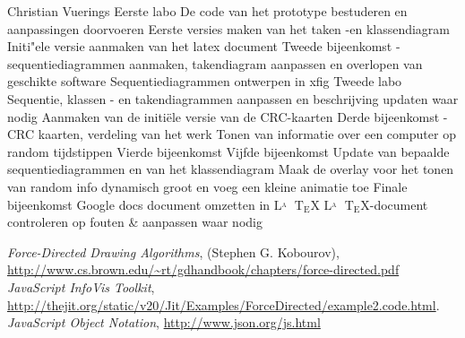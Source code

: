 \documentclass[a4paper,oneside]{report}
\def\latex{$\mathrm{L\!\!^{{}_{\scriptstyle A}} \!\!\!\!\!\;\; T\!_{\displaystyle E} \!
X}$}
\begin{document}
\begin{studentlog}{Christian Vuerings}
{Eerste labo}
{De code van het prototype bestuderen en aanpassingen doorvoeren}
{Eerste versies maken van het taken -en klassendiagram}
{Initi"ele versie aanmaken van het latex document}
{Tweede bijeenkomst - sequentiediagrammen aanmaken, takendiagram aanpassen en overlopen van geschikte software}
{Sequentiediagrammen ontwerpen in xfig}
{Tweede labo}
{Sequentie, klassen - en takendiagrammen aanpassen en beschrijving updaten waar nodig}
{Aanmaken van de initiële versie van de CRC-kaarten}
{Derde bijeenkomst - CRC kaarten, verdeling van het werk}
{Tonen van informatie over een computer op random tijdstippen}   
{Vierde bijeenkomst}
{Vijfde bijeenkomst}
{Update van bepaalde sequentiediagrammen en van het klassendiagram}
{Maak de overlay voor het tonen van random info dynamisch groot en voeg een kleine animatie toe}
{Finale bijeenkomst}
{Google docs document omzetten in \latex}
{\latex -document controleren op fouten \& aanpassen waar nodig}
\end{studentlog}

\noindent
%
%
\def\bibname{Literatuurlijst}
%
\begin{thebibliography}{9}
%
%
\addcontentsline{toc}{chapter}{\bibname}
 \emph{Force-Directed Drawing Algorithms}, (Stephen G.  Kobourov), \url{http://www.cs.brown.edu/~rt/gdhandbook/chapters/force-directed.pdf}
 \emph{JavaScript InfoVis Toolkit}, \url{http://thejit.org/static/v20/Jit/Examples/ForceDirected/example2.code.html}.
 \emph{JavaScript Object Notation}, \url{http://www.json.org/js.html}
\end{thebibliography}
\end{document}

